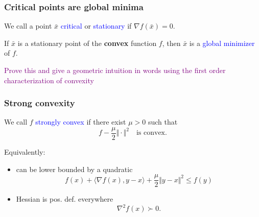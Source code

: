 \documentclass{beamer}
\begin{document}
\begin{frame}
  \frametitle{Critical points are global minima}

  \begin{definition}
    We call a point $\bar{x}$ \textcolor{blue}{critical} or \textcolor{blue}{stationary} if
    $\nabla f(\bar{x}) = 0$.
  \end{definition}
  \begin{lemma}%
    If $\bar{x}$ is a stationary point of the \textbf{convex} function $f$, then $\bar{x}$ is a \textcolor{blue}{global minimizer} of $f$.
  \end{lemma}
  \textcolor{purple}{Prove this and give a geometric intuition in words using the first order characterization of convexity}

\end{frame}


\begin{frame}
  \frametitle{Strong convexity}
  \begin{definition}
    We call $f$ \textcolor{blue}{strongly convex} if there exist $\mu> 0$ such that
    \begin{equation}
      f - \frac{\mu}{2} \Vert \cdot \Vert^2 \quad \text{is convex.}
    \end{equation}
  \end{definition}

  Equivalently:
  \begin{itemize}
    \item can be lower bounded by a quadratic
          \begin{equation}
            f(x) + \langle \nabla f(x), y-x \rangle + \frac{\mu}{2} \Vert y-x \Vert^2 \le f(y)
          \end{equation}
    \item Hessian is pos. def. everywhere
          \begin{equation}
            \nabla^2 f(x) \succ 0.
          \end{equation}
  \end{itemize}

\end{frame}
\end{document}
